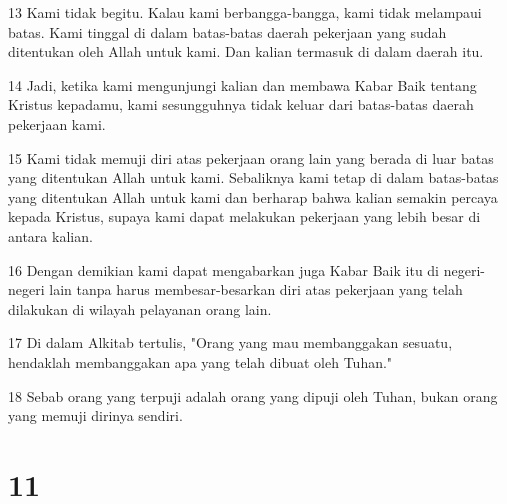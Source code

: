 \par 13 Kami tidak begitu. Kalau kami berbangga-bangga, kami tidak melampaui batas. Kami tinggal di dalam batas-batas daerah pekerjaan yang sudah ditentukan oleh Allah untuk kami. Dan kalian termasuk di dalam daerah itu.
\par 14 Jadi, ketika kami mengunjungi kalian dan membawa Kabar Baik tentang Kristus kepadamu, kami sesungguhnya tidak keluar dari batas-batas daerah pekerjaan kami.
\par 15 Kami tidak memuji diri atas pekerjaan orang lain yang berada di luar batas yang ditentukan Allah untuk kami. Sebaliknya kami tetap di dalam batas-batas yang ditentukan Allah untuk kami dan berharap bahwa kalian semakin percaya kepada Kristus, supaya kami dapat melakukan pekerjaan yang lebih besar di antara kalian.
\par 16 Dengan demikian kami dapat mengabarkan juga Kabar Baik itu di negeri-negeri lain tanpa harus membesar-besarkan diri atas pekerjaan yang telah dilakukan di wilayah pelayanan orang lain.
\par 17 Di dalam Alkitab tertulis, "Orang yang mau membanggakan sesuatu, hendaklah membanggakan apa yang telah dibuat oleh Tuhan."
\par 18 Sebab orang yang terpuji adalah orang yang dipuji oleh Tuhan, bukan orang yang memuji dirinya sendiri.

\chapter{11}

